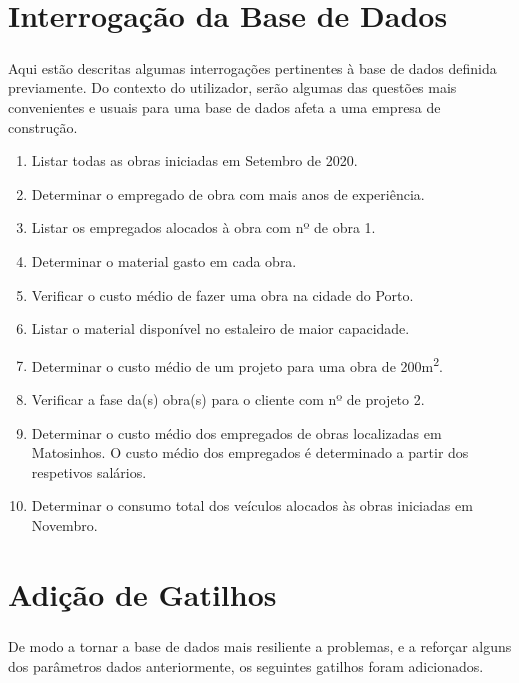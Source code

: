 \documentclass{report}
\begin{document}
	\chapter{Interrogação da Base de Dados}
		
		\paragraph{}Aqui estão descritas algumas interrogações pertinentes à base de dados
		definida previamente. Do contexto do utilizador, serão algumas das questões
		mais convenientes e usuais para uma base de dados afeta a uma empresa de construção.\\	
		
		\begin{enumerate}
			\item Listar todas as obras iniciadas em Setembro de 2020.
			\item Determinar o empregado de obra com mais anos de experiência.
			\item Listar os empregados alocados à obra com nº de obra 1.
			\item Determinar o material gasto em cada obra.
			\item Verificar o custo médio de fazer uma obra na cidade do Porto.
			\item Listar o material disponível no estaleiro de maior capacidade.
			\item Determinar o custo médio de um projeto para uma obra de 
			200m\textsuperscript{2}.
			\item Verificar a fase da(s) obra(s) para o cliente com nº de projeto 2.
			\item Determinar o custo médio dos empregados de obras localizadas em Matosinhos.
			O custo médio dos empregados é determinado a partir dos respetivos salários.
			\item Determinar o consumo total dos veículos alocados às obras iniciadas em 
			Novembro.
		\end{enumerate}		
	\chapter{Adição de Gatilhos}
		
		\paragraph{}De modo a tornar a base de dados mais resiliente a problemas, e a reforçar
		alguns dos parâmetros dados anteriormente, os seguintes gatilhos foram adicionados.
		
\end{document}
